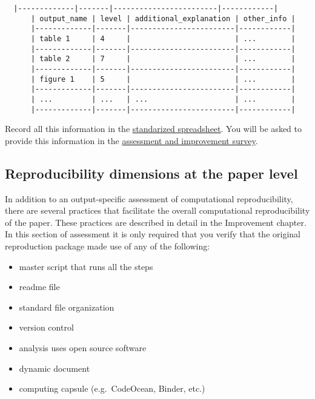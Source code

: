 \documentclass[]{book}
\providecommand{\tightlist}{%
  \setlength{\itemsep}{0pt}\setlength{\parskip}{0pt}}
\begin{document}
\begin{verbatim}
  |-------------|-------|------------------------|------------|
      | output_name | level | additional_explanation | other_info |
      |-------------|-------|------------------------|------------|
      | table 1     | 4     |                        | ...        |
      |-------------|-------|------------------------|------------|
      | table 2     | 7     |                        | ...        |
      |-------------|-------|------------------------|------------|
      | figure 1    | 5     |                        | ...        |
      |-------------|-------|------------------------|------------|
      | ...         | ...   | ...                    | ...        |
      |-------------|-------|------------------------|------------|
\end{verbatim}

Record all this information in the \href{https://docs.google.com/spreadsheets/d/1LUIdVFH0OfR70C7z07TYeE-uWzKI_JIeWUMaYhqEKK0/edit\#gid=1384504774\&range=A1}{standarized spreadsheet}. You will be asked to provide this information in the \href{ADD\%20LINK}{assessment and improvement survey}.

\hypertarget{reproducibility-dimensions-at-the-paper-level}{%
\subsection{Reproducibility dimensions at the paper level}\label{reproducibility-dimensions-at-the-paper-level}}

In addition to an output-specific assessment of computational reproducibility, there are several practices that facilitate the overall computational reproducibility of the paper. These practices are described in detail in the Improvement chapter. In this section of assessment it is only required that you verify that the original reproduction package made use of any of the following:

\begin{itemize}
\tightlist
\item
  master script that runs all the steps
\item
  readme file
\item
  standard file organization\\
\item
  version control
\item
  analysis uses open source software\\
\item
  dynamic document\\
\item
  computing capsule (e.g.~CodeOcean, Binder, etc.)
\end{itemize}
\end{document}
